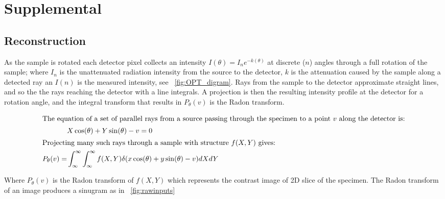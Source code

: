 \section{Supplemental}
\subsection{Reconstruction}

As the sample is rotated each detector pixel collects an intensity \(I(\theta) = I_{n}e^{-k(\theta)}\) at discrete (\(n\)) angles through a full rotation of the sample; where \(I_{n}\) is the unattenuated radiation intensity from the source to the detector, \(k\) is the attenuation caused by the sample along a detected ray an \(I(n)\) is the measured intensity, see \figurename~\ref{fig:OPT_digram}.
Rays from the sample to the detector approximate straight lines, and so the the rays reaching the detector with a line integrals.
A projection is then the resulting intensity profile at the detector for a rotation angle, and the integral transform that results in \(P_\theta(v)\)
is the \gls{Radon transform}.

\begin{align}
    \intertext{The equation of a set of parallel rays from a source passing through the specimen to a point \(v\) along the detector is:}
    &X\cos(\theta) + Y\sin(\theta) - v = 0 \\
    \intertext{Projecting many such rays through a sample with structure \(f(X,Y)\) gives:}
    P_\theta(v) = &\int_{\infty}^{\infty} \int_{\infty}^{\infty} f(X,Y)\delta (x\cos(\theta)+y \sin(\theta)-v)dX dY
\end{align}


Where \(P_\theta(v)\) is the \gls{Radon transform} of \(f(X,Y)\) which represents the contrast image of \gls{2D} slice of the specimen.
The \gls{Radon transform} of an image produces a \gls{sinugram} as in \figurename~\ref{fig:rawinputs}



